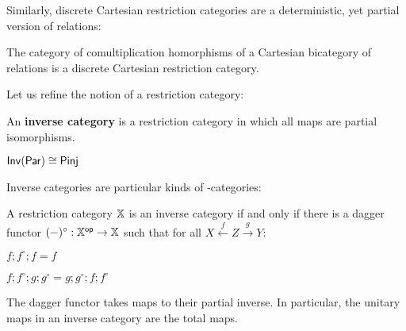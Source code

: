 %
%
Similarly, discrete Cartesian restriction categories are a deterministic, yet partial version of relations:
\begin{lemma}
The category of comultiplication homorphisms of a Cartesian bicategory of relations is a discrete Cartesian restriction category.
\end{lemma}
Let us refine the notion of a restriction category:
\begin{definition}
An {\bf inverse category} is a restriction category in which all maps are partial isomorphisms.
\end{definition}
\begin{example}
$\mathsf{Inv}(\mathsf{Par})\cong\mathsf{Pinj}$
\end{example}
Inverse categories are particular kinds of \dag-categories:
\begin{theorem}
A restriction category $\mathbb{X}$ is an inverse category if and only if there is a dagger functor $(-)^\circ:\mathbb{X}^{\mathsf{op}}\to\mathbb{X}$ such that for all $X\xleftarrow{f} Z \xrightarrow{g} Y$:

\noindent
\begin{minipage}{14cm}
\begin{multicols}{2}
\begin{enumerate}[label={\bf [INV.\arabic*]}, ref={\bf [INV.\arabic*]}, labelindent=0pt, itemsep=0pt]
\item $f; f^\circ ; f = f$
\label{INV.1}
\item $f ; f ^\circ ;g; g^\circ = g;g^\circ ; f; f ^\circ $
\label{INV.2}
\end{enumerate}
\end{multicols}
\end{minipage}

\end{theorem}
The dagger functor takes maps to their partial inverse.
In particular, the unitary maps in an inverse category are the total maps.


